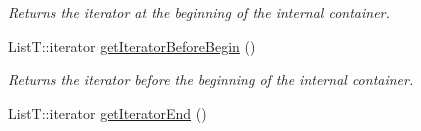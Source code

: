 \begin{DoxyCompactItemize}
\begin{DoxyCompactList}\small\item\em Returns the iterator at the beginning of the internal container. \end{DoxyCompactList}\item 
\hypertarget{classmsf__core_1_1SortedContainer_a17fa1667d94905e8def74a65002907ed}{List\-T\-::iterator \hyperlink{classmsf__core_1_1SortedContainer_a17fa1667d94905e8def74a65002907ed}{get\-Iterator\-Before\-Begin} ()}\label{classmsf__core_1_1SortedContainer_a17fa1667d94905e8def74a65002907ed}

\begin{DoxyCompactList}\small\item\em Returns the iterator before the beginning of the internal container. \end{DoxyCompactList}\item 
\hypertarget{classmsf__core_1_1SortedContainer_af1b1597192ac889cc918d8516cd6345c}{List\-T\-::iterator \hyperlink{classmsf__core_1_1SortedContainer_af1b1597192ac889cc918d8516cd6345c}{get\-Iterator\-End} ()}\label{classmsf__core_1_1SortedContainer_af1b1597192ac889cc918d8516cd6345c}


\end{DoxyCompactItemize}
